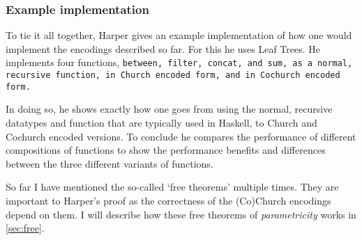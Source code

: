 \subsubsection{Example implementation}
To tie it all together, Harper gives an example implementation of how one would implement the encodings described so far.
For this he uses Leaf Trees.
He implements four functions, \tt{between}, \tt{filter}, \tt{concat}, and \tt{sum}, as a normal, recursive function, in Church encoded form, and in Cochurch encoded form.

In doing so, he shows exactly how one goes from using the normal, recursive datatypes and function that are typically used in Haskell, to Church and Cochurch encoded versions.
To conclude he compares the performance of different compositions of functions to show the performance benefits and differences between the three different variants of functions.

So far I have mentioned the so-called `free theorems' multiple times.
They are important to Harper's proof as the correctness of the (Co)Church encodings depend on them.
I will describe how these free theorems of \textit{parametricity} works in \autoref{sec:free}.

\iffalse
\begin{itemize}
    \Item 
\end{itemize}
\fi

